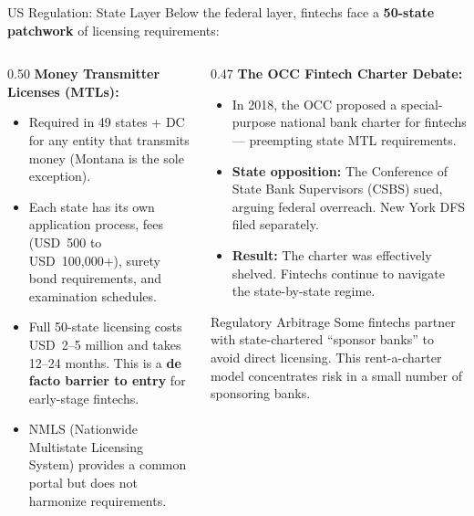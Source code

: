 \begin{frame}{US Regulation: State Layer}
  Below the federal layer, fintechs face a \textbf{50-state patchwork} of
  licensing requirements:

  \vspace{0.5em}
  \begin{columns}[T]
    \begin{column}{0.50\textwidth}
      \textcolor{mlpurple}{\textbf{Money Transmitter Licenses (MTLs):}}
      \begin{itemize}
        \item Required in 49 states + DC for any entity that transmits money
              (Montana is the sole exception).
        \item Each state has its own application process, fees (USD~500 to
              USD~100,000+), surety bond requirements, and examination
              schedules.
        \item Full 50-state licensing costs USD~2--5 million and takes
              12--24 months. This is a \textbf{de facto barrier to entry}
              for early-stage fintechs.
        \item NMLS (Nationwide Multistate Licensing System) provides a
              common portal but does not harmonize requirements.
      \end{itemize}
    \end{column}
    \begin{column}{0.47\textwidth}
      \textcolor{mlpurple}{\textbf{The OCC Fintech Charter Debate:}}
      \begin{itemize}
        \item In 2018, the OCC proposed a special-purpose national bank
              charter for fintechs --- preempting state MTL requirements.
        \item \textbf{State opposition:} The Conference of State Bank
              Supervisors (CSBS) sued, arguing federal overreach. New York
              DFS filed separately.
        \item \textbf{Result:} The charter was effectively shelved. Fintechs
              continue to navigate the state-by-state regime.
      \end{itemize}

      \vspace{0.3em}
      \begin{alertblock}{Regulatory Arbitrage}
        Some fintechs partner with state-chartered ``sponsor banks'' to
        avoid direct licensing. This \textcolor{mlred}{rent-a-charter} model
        concentrates risk in a small number of sponsoring banks.
      \end{alertblock}
    \end{column}
  \end{columns}
\end{frame}

